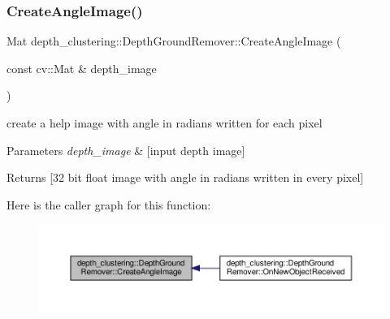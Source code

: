 \subsubsection{\texorpdfstring{Create\+Angle\+Image()}{CreateAngleImage()}}
{\footnotesize\ttfamily Mat depth\+\_\+clustering\+::\+Depth\+Ground\+Remover\+::\+Create\+Angle\+Image (\begin{DoxyParamCaption}\item[{const cv\+::\+Mat \&}]{depth\+\_\+image }\end{DoxyParamCaption})\hspace{0.3cm}{\ttfamily [protected]}}



create a help image with angle in radians written for each pixel 


\begin{DoxyParams}{Parameters}
{\em depth\+\_\+image} & \mbox{[}input depth image\mbox{]} \\
\hline
\end{DoxyParams}
\begin{DoxyReturn}{Returns}
\mbox{[}32 bit float image with angle in radians written in every pixel\mbox{]} 
\end{DoxyReturn}
Here is the caller graph for this function\+:\nopagebreak
\begin{figure}[H]
\begin{center}
\leavevmode
\includegraphics[width=350pt]{classdepth__clustering_1_1DepthGroundRemover_af533c51a44aad9a56c12445b61b801b9_icgraph}
\end{center}
\end{figure}
\mbox{\label{classdepth__clustering_1_1DepthGroundRemover_a29ba07a101794aab322ae3c0671806e0}} 
